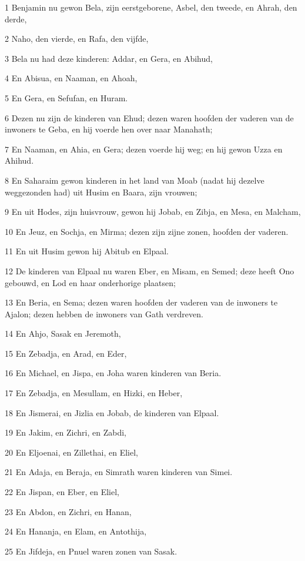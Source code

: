 \par 1 Benjamin nu gewon Bela, zijn eerstgeborene, Asbel, den tweede, en Ahrah, den derde,
\par 2 Naho, den vierde, en Rafa, den vijfde,
\par 3 Bela nu had deze kinderen: Addar, en Gera, en Abihud,
\par 4 En Abisua, en Naaman, en Ahoah,
\par 5 En Gera, en Sefufan, en Huram.
\par 6 Dezen nu zijn de kinderen van Ehud; dezen waren hoofden der vaderen van de inwoners te Geba, en hij voerde hen over naar Manahath;
\par 7 En Naaman, en Ahia, en Gera; dezen voerde hij weg; en hij gewon Uzza en Ahihud.
\par 8 En Saharaim gewon kinderen in het land van Moab (nadat hij dezelve weggezonden had) uit Husim en Baara, zijn vrouwen;
\par 9 En uit Hodes, zijn huisvrouw, gewon hij Jobab, en Zibja, en Mesa, en Malcham,
\par 10 En Jeuz, en Sochja, en Mirma; dezen zijn zijne zonen, hoofden der vaderen.
\par 11 En uit Husim gewon hij Abitub en Elpaal.
\par 12 De kinderen van Elpaal nu waren Eber, en Misam, en Semed; deze heeft Ono gebouwd, en Lod en haar onderhorige plaatsen;
\par 13 En Beria, en Sema; dezen waren hoofden der vaderen van de inwoners te Ajalon; dezen hebben de inwoners van Gath verdreven.
\par 14 En Ahjo, Sasak en Jeremoth,
\par 15 En Zebadja, en Arad, en Eder,
\par 16 En Michael, en Jispa, en Joha waren kinderen van Beria.
\par 17 En Zebadja, en Mesullam, en Hizki, en Heber,
\par 18 En Jismerai, en Jizlia en Jobab, de kinderen van Elpaal.
\par 19 En Jakim, en Zichri, en Zabdi,
\par 20 En Eljoenai, en Zillethai, en Eliel,
\par 21 En Adaja, en Beraja, en Simrath waren kinderen van Simei.
\par 22 En Jispan, en Eber, en Eliel,
\par 23 En Abdon, en Zichri, en Hanan,
\par 24 En Hananja, en Elam, en Antothija,
\par 25 En Jifdeja, en Pnuel waren zonen van Sasak.
